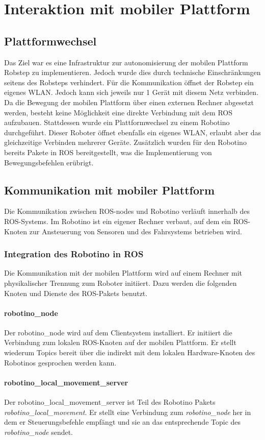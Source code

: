 \chapter{Interaktion mit mobiler Plattform}
	\section{Plattformwechsel}
	Das Ziel war es eine Infrastruktur zur autonomisierung der mobilen Plattform Robstep zu implementieren. Jedoch wurde dies durch technische Einschränkungen seitens des Robsteps verhindert. Für die Kommunikation öffnet der Robstep ein eigenes WLAN. Jedoch kann sich jeweils nur 1 Gerät mit diesem Netz verbinden. Da die Bewegung der mobilen Plattform über einen externen Rechner abgesetzt werden, besteht keine Möglichkeit eine direkte Verbindung mit dem ROS aufzubauen. Stattdessen wurde ein Plattformwechsel zu einem Robotino durchgeführt. Dieser Roboter öffnet ebenfalls ein eigenes WLAN, erlaubt aber das gleichzeitige Verbinden mehrerer Geräte. Zusätzlich wurden für den Robotino bereits Pakete in ROS bereitgestellt, was die Implementierung von Bewegungsbefehlen erübrigt.

	\section{Kommunikation mit mobiler Plattform}
	Die Kommunikation zwischen ROS-nodes und Robotino verläuft innerhalb des ROS-Systems. Im Robotino ist ein eigener Rechner verbaut, auf dem ein ROS-Knoten zur Ansteuerung von Sensoren und des Fahrsystems betrieben wird.
		\subsection{Integration des Robotino in ROS}
		Die Kommunikation mit der mobilen Plattform wird auf einem Rechner mit physikalischer Trennung zum Roboter initiiert. Dazu werden die folgenden Knoten und Dienste des ROS-Pakets benutzt.
		\subsubsection{robotino\_node}
		Der robotino\_node wird auf dem Clientsystem installiert. Er initiiert die Verbindung zum lokalen ROS-Knoten auf der mobilen Plattform. Er stellt wiederum Topics bereit über die indirekt mit dem lokalen Hardware-Knoten des Robotinos gesprochen werden kann.
		\subsubsection{robotino\_local\_movement\_server}
		Der robotino\_local\_movement\_server ist Teil des Robotino Pakets \textit{robotino\_local\_movement}. Er stellt eine Verbindung zum \textit{robotino\_node} her in dem er Steuerungsbefehle empfängt und sie an das entsprechende Topic des \textit{robotino\_node} sendet.
